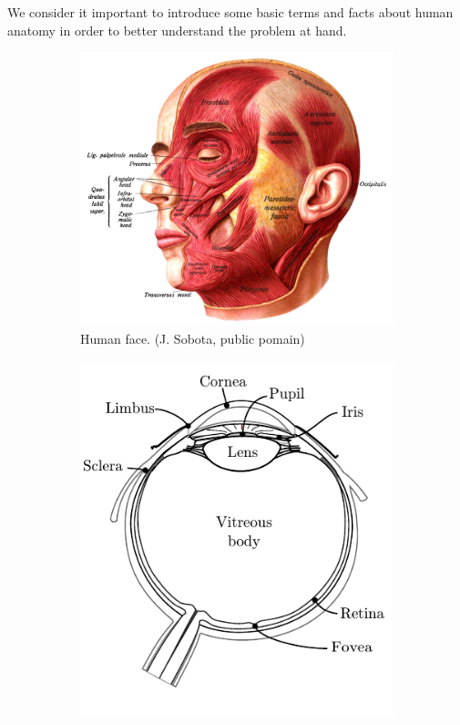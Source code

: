 We consider it important to introduce some basic terms and facts about human anatomy in order to better understand the problem at hand.

\begin{figure}[ht]
	\centering 
	\begin{subfigure}[b]{0.55\textwidth}
		\centering \includegraphics[width=\linewidth]{img/analy-face.png} \caption{Human face. (J. Sobota, public pomain)} \label{i:analy-face}
	\end{subfigure}
	\begin{subfigure}[b]{0.44\textwidth}
		\centering \includegraphics[width=\linewidth]{img/analy-eye.pdf}

\end{subfigure}
\end{figure}
